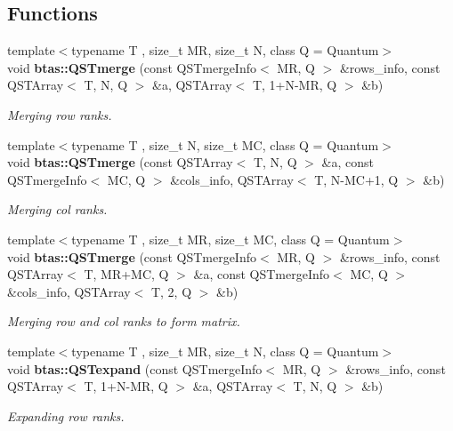 \subsection*{Functions}
\begin{DoxyCompactItemize}
\item 
{\footnotesize template$<$typename T , size\-\_\-t M\-R, size\-\_\-t N, class Q  = Quantum$>$ }\\void {\bf btas\-::\-Q\-S\-Tmerge} (const Q\-S\-Tmerge\-Info$<$ M\-R, Q $>$ \&rows\-\_\-info, const Q\-S\-T\-Array$<$ T, N, Q $>$ \&a, Q\-S\-T\-Array$<$ T, 1+N-\/M\-R, Q $>$ \&b)
\begin{DoxyCompactList}\small\item\em Merging row ranks. \end{DoxyCompactList}\item 
{\footnotesize template$<$typename T , size\-\_\-t N, size\-\_\-t M\-C, class Q  = Quantum$>$ }\\void {\bf btas\-::\-Q\-S\-Tmerge} (const Q\-S\-T\-Array$<$ T, N, Q $>$ \&a, const Q\-S\-Tmerge\-Info$<$ M\-C, Q $>$ \&cols\-\_\-info, Q\-S\-T\-Array$<$ T, N-\/M\-C+1, Q $>$ \&b)
\begin{DoxyCompactList}\small\item\em Merging col ranks. \end{DoxyCompactList}\item 
{\footnotesize template$<$typename T , size\-\_\-t M\-R, size\-\_\-t M\-C, class Q  = Quantum$>$ }\\void {\bf btas\-::\-Q\-S\-Tmerge} (const Q\-S\-Tmerge\-Info$<$ M\-R, Q $>$ \&rows\-\_\-info, const Q\-S\-T\-Array$<$ T, M\-R+M\-C, Q $>$ \&a, const Q\-S\-Tmerge\-Info$<$ M\-C, Q $>$ \&cols\-\_\-info, Q\-S\-T\-Array$<$ T, 2, Q $>$ \&b)
\begin{DoxyCompactList}\small\item\em Merging row and col ranks to form matrix. \end{DoxyCompactList}\item 
{\footnotesize template$<$typename T , size\-\_\-t M\-R, size\-\_\-t N, class Q  = Quantum$>$ }\\void {\bf btas\-::\-Q\-S\-Texpand} (const Q\-S\-Tmerge\-Info$<$ M\-R, Q $>$ \&rows\-\_\-info, const Q\-S\-T\-Array$<$ T, 1+N-\/M\-R, Q $>$ \&a, Q\-S\-T\-Array$<$ T, N, Q $>$ \&b)
\begin{DoxyCompactList}\small\item\em Expanding row ranks. \end{DoxyCompactList}\item 

\end{DoxyCompactItemize}
